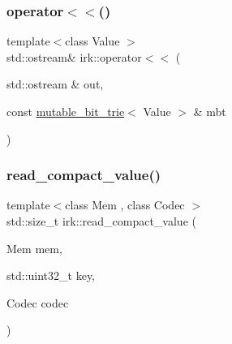 \mbox{\label{namespaceirk_aac8001645bff72cf73bf0f87512c5ed4}} 
\subsubsection{\texorpdfstring{operator$<$$<$()}{operator<<()}\hspace{0.1cm}{\footnotesize\ttfamily [3/3]}}
{\footnotesize\ttfamily template$<$class Value $>$ \\
std\+::ostream\& irk\+::operator$<$$<$ (\begin{DoxyParamCaption}\item[{std\+::ostream \&}]{out,  }\item[{const \mbox{\hyperlink{classirk_1_1mutable__bit__trie}{mutable\+\_\+bit\+\_\+trie}}$<$ Value $>$ \&}]{mbt }\end{DoxyParamCaption})}

\mbox{\label{namespaceirk_a5a2bb996aa2fce0aa00ae9aafd500bba}} 
\subsubsection{\texorpdfstring{read\+\_\+compact\+\_\+value()}{read\_compact\_value()}}
{\footnotesize\ttfamily template$<$class Mem , class Codec $>$ \\
std\+::size\+\_\+t irk\+::read\+\_\+compact\+\_\+value (\begin{DoxyParamCaption}\item[{Mem}]{mem,  }\item[{std\+::uint32\+\_\+t}]{key,  }\item[{Codec}]{codec }\end{DoxyParamCaption})}

\mbox{\label{namespaceirk_a9bbfe619867ce962c69054e3417b4b11}} 
